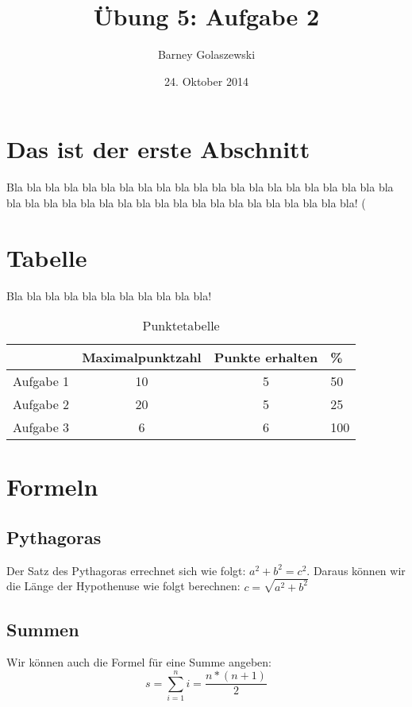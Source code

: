 \documentclass[11pt,a4paper]{article}
\title{Übung 5: Aufgabe 2}
\date{24. Oktober 2014}
\author{Barney Golaszewski}
\begin{document}
\maketitle


\section{Das ist der erste Abschnitt}
Bla bla bla bla bla bla bla bla bla bla bla bla bla bla bla bla bla bla bla bla bla bla bla bla bla bla bla bla bla bla bla bla bla bla bla bla bla bla bla bla! (\citep{meyberg2001hohere}

\section{Tabelle}
Bla bla bla bla bla bla bla bla bla bla bla!
 
\begin{table}[h]
\centering
\begin{tabular}{r|c|c|l}
 & Maximalpunktzahl & Punkte erhalten & \% \\
\hline
Aufgabe 1 & 10 & 5 & 50 \\
Aufgabe 2 & 20 & 5 & 25 \\
Aufgabe 3 & 6 & 6 & 100 \\
\end{tabular}
\caption{Punktetabelle}
\end{table}

\section{Formeln}

\subsection{Pythagoras}
Der Satz des Pythagoras errechnet sich wie folgt: $a^2+b^2=c^2$. Daraus können wir die Länge der Hypothenuse wie folgt berechnen: $c=\sqrt{a^2+b^2}$

\subsection{Summen}
Wir können auch die Formel für eine Summe angeben:
\begin{equation}
s=\sum\limits_{i=1}^ni=\frac{n*(n+1)}{2}
\end{equation}



\end{document}
